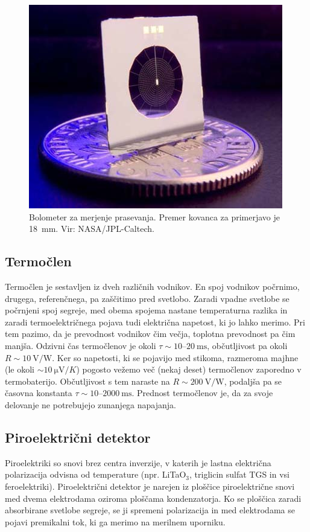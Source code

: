 \begin{figure}[h]
\centering
\includegraphics[width=80truemm]{slike/11_Bolometer.jpg}
\caption{Bolometer za merjenje prasevanja. Premer kovanca za primerjavo je 18~mm. 
Vir: NASA/JPL-Caltech.}
\label{fig:Bolometer}
\end{figure}

\subsection*{Termočlen}
Termočlen je sestavljen iz dveh različnih vodnikov. En spoj vodnikov počrnimo, drugega, 
referenčnega, pa zaščitimo pred svetlobo. Zaradi vpadne svetlobe se počrnjeni spoj 
segreje, med obema spojema nastane temperaturna razlika in zaradi termoelektričnega 
pojava tudi električna napetost, ki jo lahko merimo. Pri tem pazimo, da je prevodnost
vodnikov čim večja, toplotna prevodnost pa čim manjša. Odzivni čas termočlenov je 
okoli $\tau \sim 10$--$20~\si{\milli\second}$, občutljivost pa okoli $R \sim 10~\si{\volt/\watt}$.
Ker so napetosti, ki se pojavijo med stikoma, razmeroma majhne (le okoli 
$\sim 10~\si{\micro\volt/K}$) pogosto vežemo več (nekaj deset) termočlenov zaporedno v
termobaterijo. Občutljivost s tem naraste na $R \sim 200~\si{\volt/\watt}$, podaljša 
pa se časovna konstanta $\tau \sim 10$--$2000~\si{\milli\second}$. Prednost termočlenov je,
da za svoje delovanje ne potrebujejo zunanjega napajanja. 

\subsection*{Piroelektrični detektor}
Piroelektriki so snovi brez centra inverzije, v katerih je lastna električna 
polarizacija odvisna od temperature (npr. LiTaO$_3$, triglicin sulfat TGS 
in vsi feroelektriki). Piroelektrični detektor je narejen iz 
ploščice piroelektrične snovi med dvema elektrodama oziroma ploščama kondenzatorja.
Ko se ploščica zaradi absorbirane svetlobe segreje, se ji spremeni polarizacija in 
med elektrodama se pojavi premikalni tok, ki ga merimo na merilnem uporniku.

